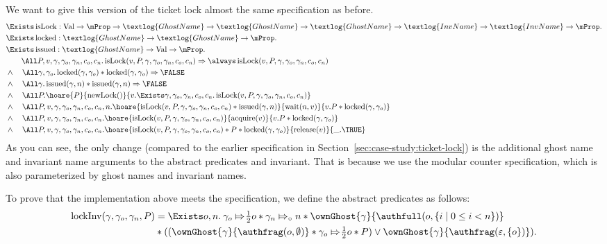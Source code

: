 We want to give this version of the ticket lock almost the same specification as before.
\begin{align*}
    &\Exists \isLock : \Val \to \Prop \to \textlog{GhostName} \to \textlog{GhostName} \to \textlog{GhostName} \to \textlog{InvName} \to \textlog{InvName} \to \Prop.\nonumber\\
    &\Exists \locked : \textlog{GhostName} \to \textlog{GhostName} \to \Prop.\nonumber\\
    &\Exists \issued : \textlog{GhostName} \to \Val \to \Prop.\nonumber\\
    &\quad\quad\All P, v, \gamma, \gamma_{o}, \gamma_{n}, c_{o}, c_{n}. \isLock(v, P, \gamma, \gamma_{o}, \gamma_{n}, c_{o}, c_{n}) \implies \persistently \isLock(v, P, \gamma, \gamma_{o}, \gamma_{n}, c_{o}, c_{n})\\
      &\land\quad\All \gamma, \gamma_{o}. \locked(\gamma, \gamma_{o}) \ast \locked(\gamma, \gamma_{o}) \implies \FALSE\\
      &\land\quad\All \gamma. \issued(\gamma,n) \ast \issued(\gamma,n) \implies \FALSE\\
    &\land\quad\All P.\hoare{P}{\newLock ()}{v.\Exists \gamma, \gamma_{o}, \gamma_{n}, c_{o}, c_{n}.\isLock(v, P, \gamma, \gamma_{o}, \gamma_{n}, c_{o}, c_{n})}\\
      &\land\quad\All P, v, \gamma, \gamma_{o}, \gamma_{n}, c_{o}, c_{n}, n.\hoare{\isLock(v, P, \gamma, \gamma_{o}, \gamma_{n}, c_{o}, c_{n}) \ast \issued(\gamma, n)}{\wait (n, v)}{v.P \ast \locked(\gamma, \gamma_{o})}\\
      &\land\quad\All P, v, \gamma, \gamma_{o}, \gamma_{n}, c_{o}, c_{n}.\hoare{\isLock(v, P, \gamma, \gamma_{o}, \gamma_{n}, c_{o}, c_{n})}{\acquire (v)}{v.P \ast \locked(\gamma, \gamma_{o})}\\
     &\land\quad\All P, v, \gamma, \gamma_{o}, \gamma_{n}, c_{o}, c_{n}.\hoare{\isLock(v, P, \gamma, \gamma_{o}, \gamma_{n}, c_{o}, c_{n}) \ast P \ast \locked(\gamma, \gamma_{o})}{\release (v)}{\_.\TRUE}
\end{align*}
%
As you can see, the only change (compared to the earlier specification in Section~\ref{sec:case-study:ticket-lock}) is the additional ghost name and invariant name arguments to the abstract predicates and invariant.
That is because we use the modular counter specification, which is also parameterized by ghost names and invariant names. 

To prove that the implementation above meets the specification, we define the abstract predicates as follows:
\begin{align*}
  \lockInv(\gamma, \gamma_{o}, \gamma_{n}, P) & = \Exists o, n. \: \abstractstatefrac{\gamma_{o}}{2}{o} \ast \abstractstatefullfrag{\gamma_{n}}{n} \ast \ownGhost{\gamma}{\authfull (o, \{ i \mid 0 \leq i < n \})}\\
  &\ast ((\ownGhost{\gamma}{\authfrag (o, \emptyset)} \ast \abstractstatefrac{\gamma_{o}}{2}{o} \ast P) \lor \ownGhost{\gamma}{\authfrag (\epsilon, \{o \})}).
\end{align*}
  

